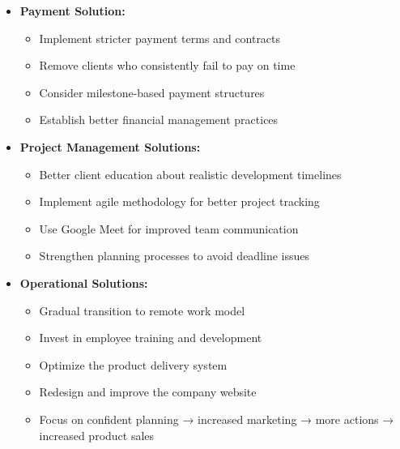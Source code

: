 \documentclass[12pt,a4paper]{article}
\begin{document}
\begin{itemize}
    \item \textbf{Payment Solution:}
    \begin{itemize}
        \item Implement stricter payment terms and contracts
        \item Remove clients who consistently fail to pay on time
        \item Consider milestone-based payment structures
        \item Establish better financial management practices
    \end{itemize}
    
    \item \textbf{Project Management Solutions:}
    \begin{itemize}
        \item Better client education about realistic development timelines
        \item Implement agile methodology for better project tracking
        \item Use Google Meet for improved team communication
        \item Strengthen planning processes to avoid deadline issues
    \end{itemize}
    
    \item \textbf{Operational Solutions:}
    \begin{itemize}
        \item Gradual transition to remote work model
        \item Invest in employee training and development
        \item Optimize the product delivery system
        \item Redesign and improve the company website
        \item Focus on confident planning → increased marketing → more actions → increased product sales
    \end{itemize}


\end{itemize}
\end{document}
